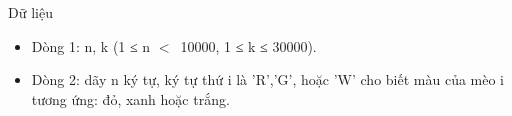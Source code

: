 Dữ liệu
\begin{itemize}
	\item Dòng 1: n, k (1 ≤ n $<$ 10000, 1 ≤ k ≤ 30000).
	\item Dòng 2: dãy n ký tự, ký tự thứ i là 'R','G', hoặc 'W' cho biết màu của mèo i tương ứng: đỏ, xanh hoặc trắng.
\end{itemize}